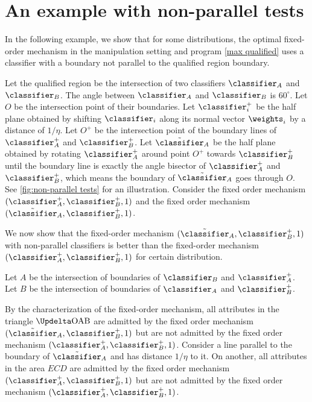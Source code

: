 \section{An example with non-parallel tests}\label{appendix: counter ex}
In the following example, we show that for some distributions, the optimal fixed-order mechanism in the manipulation setting and program \ref{max qualified} uses a classifier with a boundary not parallel to the qualified region boundary.

Let the qualified region be the intersection of two classifiers $\classifier_A$ and $\classifier_B$. 
The angle between $\classifier_A$ and $\classifier_B$ is $60^\circ$.
Let $O$ be the intersection point of their boundaries. 
Let $\classifier_i^+ $ be the half plane obtained by shifting $\classifier_i$ along its normal vector $\weights_i$ by a distance of $1/\eta$.
Let $O^+$ be the intersection point of the boundary lines of $\classifier_A^+ $ and $\classifier_B^+ $.
Let $\tilde\classifier_A$ be the half plane obtained by rotating $\classifier_A^+ $ around point $O^+$ towards $\classifier_B^+ $ until the boundary line is exactly the angle bisector of $\classifier_A^+ $ and $\classifier_B^+$, which means the boundary of $\tilde \classifier_A$ goes through $O$.
See \cref{fig:non-parallel tests} for an illustration.
Consider the fixed order mechanism $(\classifier_A^+,\classifier_B^+,1)$ and the fixed order mechanism $(\tilde\classifier_A,\classifier_B^+,1)$.

We now show that the fixed-order mechanism $(\tilde\classifier_A,\classifier_B^+,1)$ with non-parallel classifiers is better than the fixed-order mechanism $(\classifier_A^+,\classifier_B^+,1)$ for certain distribution. 

Let $A$ be the intersection of boundaries of $\classifier_B$ and $\classifier_A^+$. Let $B$ be the intersection of boundaries of $\classifier_A$ and $\classifier_B^+$.



By the characterization of the fixed-order mechanism, all attributes in the triangle $\Updelta \text{OAB}$ are admitted by the fixed order mechanism $(\tilde\classifier_A,\classifier_B^+,1)$ but are not admitted by the fixed order mechanism $(\classifier_A^+,\classifier_B^+,1)$. 
Consider a line parallel to the boundary of $\tilde\classifier_A$ and has distance $1/\eta$ to it. 
On another, all attributes in the area $ECD$ are admitted by the fixed order mechanism $(\classifier_A^+,\classifier_B^+,1)$ but are not admitted by the fixed order mechanism $(\classifier_A^+,\classifier_B^+,1)$.


